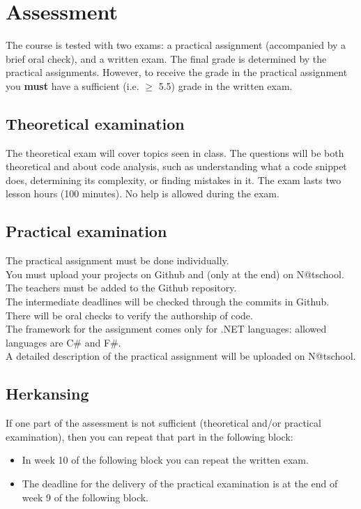 \section{Assessment}
	The course is tested with two exams: a practical assignment (accompanied by a brief oral check), and a written exam. The final grade is determined by the practical assignments. However, to receive the grade in the practical assignment you \textbf{must} have a sufficient (i.e. $\geq$ 5.5) grade in the written exam.

	\subsection{Theoretical examination}
		The theoretical exam will cover topics seen in class. The questions will be both theoretical and about code analysis, such as understanding what a code snippet does, determining its complexity, or finding mistakes in it.
		The exam lasts two lesson hours (100 minutes). No help is allowed during the exam.

	\subsection{Practical examination}
	The practical assignment must be done individually. \\
	You must upload your projects on Github and (only at the end) on N@tschool. \\
	The teachers must be added to the Github repository. \\
	The intermediate deadlines will be checked through the commits in Github.\\
	There will be oral checks to verify the authorship of code. \\
	The framework for the assignment comes only for .NET languages: allowed languages are C\# and F\#.  \\ 
	A detailed description of the practical assignment will be uploaded on N@tschool.

	\subsection{Herkansing}
	If one part of the assessment is not sufficient (theoretical and/or practical examination), then you can repeat that part in the following block:
	\begin{itemize}
	\item In week 10 of the following block you can repeat the written exam.
	\item The deadline for the delivery of the practical examination is at the end of week 9 of the following block.
	\end{itemize}
	
